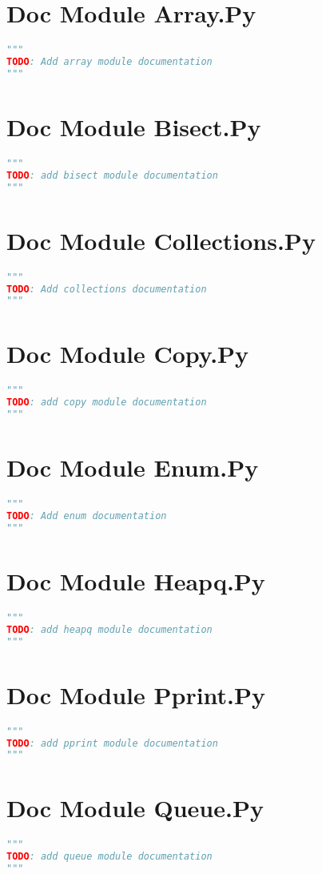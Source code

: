 \documentclass[a4paper,landscape]{report}
\begin{document}
\section{Doc Module Array.Py}
\begin{lstlisting}[language=Python]
"""
TODO: Add array module documentation
"""
\end{lstlisting}
\section{Doc Module Bisect.Py}
\begin{lstlisting}[language=Python]
"""
TODO: add bisect module documentation
"""
\end{lstlisting}
\section{Doc Module Collections.Py}
\begin{lstlisting}[language=Python]
"""
TODO: Add collections documentation
"""
\end{lstlisting}
\section{Doc Module Copy.Py}
\begin{lstlisting}[language=Python]
"""
TODO: add copy module documentation
"""
\end{lstlisting}
\section{Doc Module Enum.Py}
\begin{lstlisting}[language=Python]
"""
TODO: Add enum documentation
"""
\end{lstlisting}
\section{Doc Module Heapq.Py}
\begin{lstlisting}[language=Python]
"""
TODO: add heapq module documentation
"""
\end{lstlisting}
\section{Doc Module Pprint.Py}
\begin{lstlisting}[language=Python]
"""
TODO: add pprint module documentation
"""
\end{lstlisting}
\section{Doc Module Queue.Py}
\begin{lstlisting}[language=Python]
"""
TODO: add queue module documentation
"""
\end{lstlisting}
\end{document}
